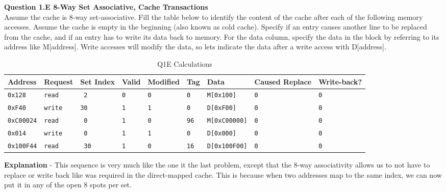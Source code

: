 \documentclass[a4paper,11pt]{article}
\newcommand{\T}{\texttt}
\begin{document}
\item \textbf{Question 1.E 8-Way Set Associative, Cache Transactions } \\
Assume the cache is 8-way set-associative. Fill the table below to identify the content of the cache after each of the following memory accesses. Assume the cache is empty in the beginning (also known as cold cache). Specify if an entry causes another line to be replaced from the cache, and if an entry has to write its data back to memory. For the data column, specify the data in the block by referring to its address like M[address]. Write accesses will modify the data, so lets indicate the data after a write access with D[address].

\begin{table}[H]
\caption{Q1E Calculations} \label{tab:q1calc2} 
\begin{center}
\begin{tabular}{| l | l | l | l | l | l | l | l | l |}
\hline
Address       & Request    & Set Index & Valid  & Modified  & Tag    & Data            & Caused Replace  & Write-back?    \\ \hline
\T{0x128}     &  \T{read}  & \T{ 2 }       & \T{0}  & \T{0}     & \T{0}  & \T{M[0x100]}    &      \T{0}      & \T{0}    \\ \hline
\T{0xF40}     &  \T{write} & \T{30 }       & \T{1}  & \T{1}     & \T{0}  & \T{D[0xF00]}    &      \T{0}      & \T{0}    \\ \hline
\T{0xC00024}  &  \T{read}  & \T{ 0 }       & \T{1}  & \T{0}     & \T{96} & \T{M[0xC00000]} &      \T{0}      & \T{0}    \\ \hline
\T{0x014}     &  \T{write} & \T{ 0 }       & \T{1}  & \T{1}     & \T{0}  & \T{D[0x000]}    &      \T{0}      & \T{0}    \\ \hline
\T{0x100F44}  &  \T{read}  & \T{ 30}       & \T{1}  & \T{0}     & \T{16} & \T{D[0x100F00]} &      \T{0}      & \T{0}    \\ \hline
\end{tabular}
\end{center}
\end{table}

\textbf{Explanation} - This sequence is very much like the one it the last problem, except that the 8-way associativity allows us to not have to replace or write back like was required in the direct-mapped cache. This is because when two addresses map to the same index, we can now put it in any of the open 8 spots per set. \\
\end{document}
